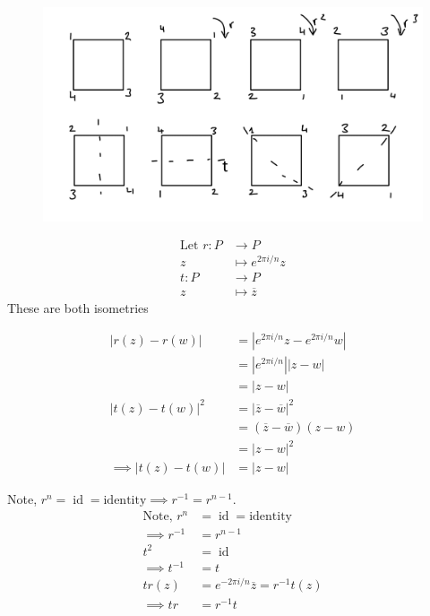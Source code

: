\begin{figure}

{\centering \includegraphics{figures/02-D8} 

}

\end{figure}

\begin{align*}
    \text{Let } r: P &\to P \\
    z &\mapsto e^{2\pi i / n}z \\
    t : P &\to P \\
    z &\mapsto \overline{z}
\end{align*}
These are both isometries

\begin{align*}
    |r(z) - r(w)| &= |e^{2\pi i / n}z -e^{2\pi i / n}w| \\
    &= |e^{2\pi i / n}||z - w| \\
    &= |z - w| \\
    |t(z) - t(w)|^2 &= |\overline{z} - \overline{w}|^2 \\
    &=(\overline{z} - \overline{w})(z - w) \\
    &= |z - w|^2 \\
    \implies |t(z) - t(w)| &= |z - w|
\end{align*}

Note, \(r^n = \operatorname{id} = \text{identity} \implies r^{-1} = r^{n - 1}\).
\begin{align*}
    \text{Note, } r^n &= \operatorname{id} = \text{identity} \\
    \implies r^{-1} &= r^{n - 1} \\
    t^2 &= \operatorname{id} \\
    \implies t^{-1} &= t \\
    tr(z) &= e^{-2\pi i / n} \overline{z} = r^{-1}t(z) \\
    \implies tr &= r^{-1}t
\end{align*}

